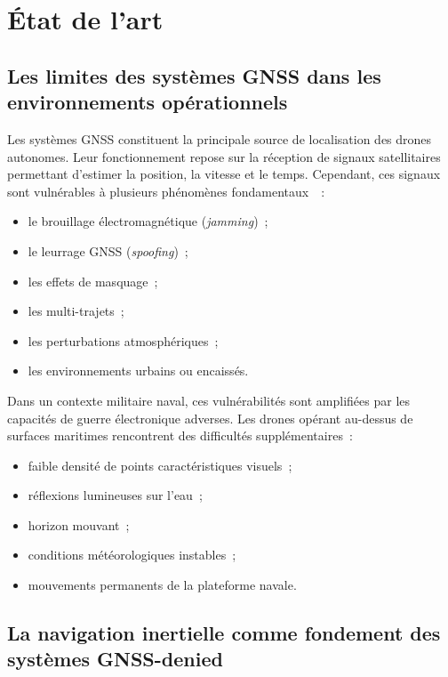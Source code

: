 \documentclass[12pt, a4paper, twoside, openright]{report}
\begin{document}
\section{État de l'art}

\subsection{Les limites des systèmes GNSS dans les environnements opérationnels}

Les systèmes GNSS constituent la principale source de localisation des drones autonomes. Leur fonctionnement repose sur la réception de signaux satellitaires permettant d'estimer la position, la vitesse et le temps. Cependant, ces signaux sont vulnérables à plusieurs phénomènes fondamentaux~\cite{mostafa2016gnss}~:

\begin{itemize}
    \item le brouillage électromagnétique (\textit{jamming})~;
    \item le leurrage GNSS (\textit{spoofing})~;
    \item les effets de masquage~;
    \item les multi-trajets~;
    \item les perturbations atmosphériques~;
    \item les environnements urbains ou encaissés.
\end{itemize}

Dans un contexte militaire naval, ces vulnérabilités sont amplifiées par les capacités de guerre électronique adverses. Les drones opérant au-dessus de surfaces maritimes rencontrent des difficultés supplémentaires~:

\begin{itemize}
    \item faible densité de points caractéristiques visuels~;
    \item réflexions lumineuses sur l'eau~;
    \item horizon mouvant~;
    \item conditions météorologiques instables~;
    \item mouvements permanents de la plateforme navale.
\end{itemize}

\subsection{La navigation inertielle comme fondement des systèmes GNSS-denied}
\end{document}
